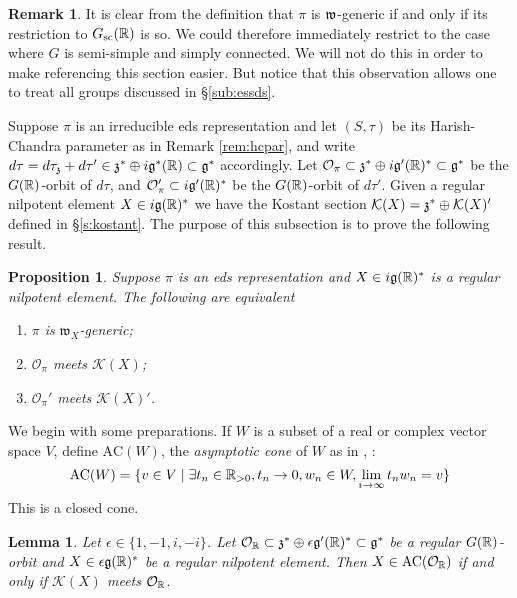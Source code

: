 \documentclass{article}
\newtheorem{lem}[thm]{Lemma}
\newtheorem{pro}[thm]{Proposition}
\theoremstyle{definition}
\newtheorem{rem}[thm]{Remark}
\numberwithin{equation}{section}
\renewcommand{\-}{\hyp{}}
\newcommand{\g}{\mathfrak g}
\renewcommand{\O}{\mathcal O}
\newcommand{\K}{\mathcal K}
\newcommand{\w}{\mathfrak w}
\newcommand{\AC}{\mathrm{AC}}
\begin{document}
\begin{rem}
	It is clear from the definition that $\pi$ is $\mathfrak{w}$-generic if and only if its restriction to $G_{\textrm{sc}}(\mathbb{R})$ is so. We could therefore immediately restrict to the case where $G$ is semi-simple and simply connected. We will not do this in order to make referencing this section easier. But notice that this observation allows one to treat all groups discussed in \S\ref{sub:essds}.
\end{rem}

Suppose $\pi$ is an irreducible eds representation and let $(S,\tau)$ be its Harish-Chandra parameter as in Remark  \ref{rem:hcpar}, and write $d\tau=d\tau_\mf{z}+d\tau' \in \mf{z}^* \oplus i\mf{g}^*(\R) \subset \g^*$ accordingly. Let $\O_\pi \subset \mf{z}^* \oplus i\mf{g}'(\R)^* \subset \mf{g}^*$ be the $G(\mathbb{R})$-orbit of $d\tau$, and $\O_\pi' \subset i\g'(\R)^*$ be the $G(\mathbb{R})$-orbit of $d\tau'$. Given a regular nilpotent element $X\in i\g(\R)^*$ we have the Kostant section $\K(X) = \mf{z}^* \oplus \K(X)'$ defined in \S\ref{s:kostant}. The purpose of this subsection is to prove the following result.

\begin{pro}
  \label{p:whittaker}
Suppose $\pi$ is an eds representation and $X\in i\g(\R)^*$ is a regular nilpotent element. The following are equivalent
\begin{enumerate}
	\item $\pi$ is $\w_X$-generic;
 	\item $\O_\pi$ meets $\K(X)$;
  	\item $\O_\pi'$ meets $\K(X)'$.
\end{enumerate}
\end{pro}

We begin with some preparations. If $W$ is a subset of a real or complex vector space $V$, define  $\AC(W)$,  the  {\it asymptotic cone} of $W$ as in   \cite[Proposition 3.7]{bvlocal}, \cite[Definition 2.9]{avav}:
$$
\AC(W)=\{v\in V\mid \exists t_n\in \R_{>0},t_n\rightarrow 0,w_n\in W,\lim_{i\rightarrow\infty}t_n w_n=v\}
$$
This is a closed cone. 

\begin{lem} \label{lem:g1}
  Let $\epsilon \in \{1,-1,i,-i\}$. Let $\O_\R\subset \mf{z}^* \oplus \epsilon\g'(\R)^* \subset \g^*$ be a regular $G(\mathbb{R})$-orbit and $X\in \epsilon\g(\R)^*$ be a regular nilpotent element.
Then  $X\in \AC(\O_\R)$ if and only if $\K(X)$ meets $\O_\R$.
\end{lem}
\end{document}
